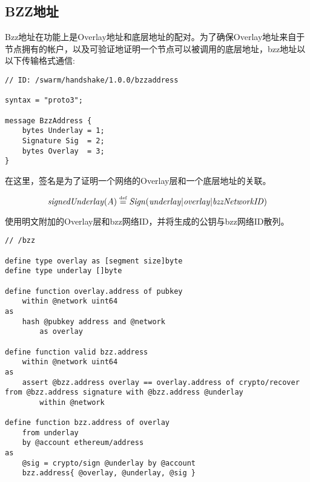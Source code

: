 \begin{definition}\label{def:underlay}
\begin{lstlisting}[]

\end{lstlisting}
\end{definition}


\subsection{BZZ地址\statusyellow}

Bzz地址在功能上是Overlay地址和底层地址的配对。为了确保Overlay地址来自于节点拥有的帐户，以及可验证地证明一个节点可以被调用的底层地址，bzz地址以以下传输格式通信:

\begin{definition}\label{def:bzz-address}
\begin{lstlisting}[]
// ID: /swarm/handshake/1.0.0/bzzaddress

syntax = "proto3";

message BzzAddress {
    bytes Underlay = 1;
    Signature Sig  = 2;
    bytes Overlay  = 3; 
}
\end{lstlisting}
\end{definition}

在这里，签名是为了证明一个网络的Overlay层和一个底层地址的关联。 

\begin{definition}\label{def:signed-underlay}
\begin{equation}
\mathit{signedUnderlay}(A) \overset{\textrm{\tiny def}}{=} \mathit{Sign}(\mathit{underlay}|
\mathit{overlay}|\mathit{bzzNetworkID})         
\end{equation}
\end{definition}

使用明文附加的Overlay层和bzz网络ID，并将生成的公钥与bzz网络ID散列。 

\begin{definition}\label{def:bzz-types}
\begin{lstlisting}[language=buzz1]
// /bzz

define type overlay as [segment size]byte
define type underlay []byte

define function overlay.address of pubkey 
    within @network uint64 
as
    hash @pubkey address and @network 
        as overlay

define function valid bzz.address 
    within @network uint64
as
    assert @bzz.address overlay == overlay.address of crypto/recover from @bzz.address signature with @bzz.address @underlay
        within @network
        
define function bzz.address of overlay
    from underlay 
    by @account ethereum/address
as
    @sig = crypto/sign @underlay by @account
    bzz.address{ @overlay, @underlay, @sig }

\end{lstlisting}
\end{definition}




